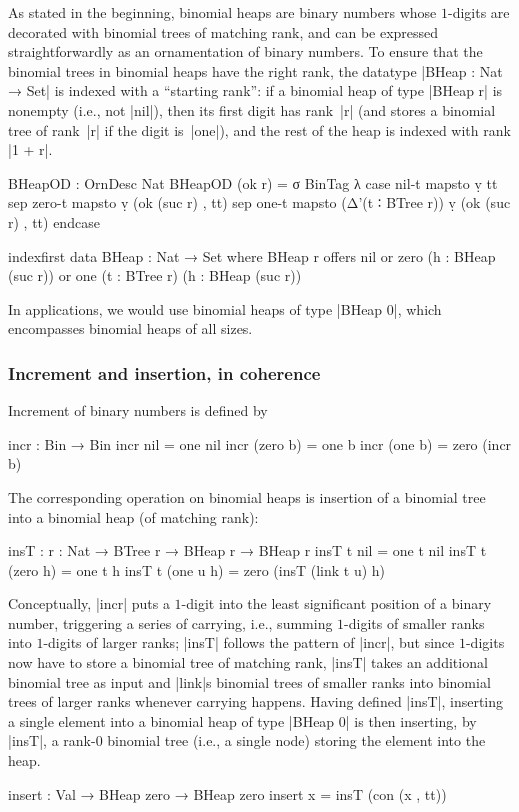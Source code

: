 As stated in the beginning, binomial heaps are binary numbers whose $1$-digits are decorated with binomial trees of matching rank, and can be expressed straightforwardly as an ornamentation of binary numbers.
To ensure that the binomial trees in binomial heaps have the right rank, the datatype |BHeap : Nat → Set| is indexed with a ``starting rank'': if a binomial heap of type |BHeap r| is nonempty (i.e., not |nil|), then its first digit has rank~|r| (and stores a binomial tree of rank~|r| if the digit is~|one|), and the rest of the heap is indexed with rank |1 + r|.
\begin{code}
BHeapOD : OrnDesc Nat
BHeapOD (ok r) = σ BinTag λ  case  nil-t   mapsto  ṿ tt
                             sep   zero-t  mapsto  ṿ (ok (suc r) , tt)
                             sep   one-t   mapsto  (Δ'(t ∶ BTree r)) ṿ (ok (suc r) , tt) endcase

indexfirst data BHeap : Nat → Set where
  BHeap r  offers  nil
           or      zero  (h : BHeap (suc r))
           or      one   (t : BTree r) (h : BHeap (suc r))
\end{code}
In applications, we would use binomial heaps of type |BHeap 0|, which encompasses binomial heaps of all sizes.

\subsubsection{Increment and insertion, in coherence}
Increment of binary numbers is defined by
\begin{code}
incr : Bin → Bin
incr nil        =  one nil
incr (zero  b)  =  one b
incr (one   b)  =  zero (incr b)
\end{code}
The corresponding operation on binomial heaps is insertion of a binomial tree into a binomial heap (of matching rank):
\begin{code}
insT : {r : Nat} → BTree r → BHeap r → BHeap r
insT t nil         = one t nil
insT t (zero   h)  = one t h
insT t (one u  h)  = zero (insT (link t u) h)
\end{code}
Conceptually, |incr| puts a $1$-digit into the least significant position of a binary number, triggering a series of carrying, i.e., summing $1$-digits of smaller ranks into $1$-digits of larger ranks; |insT| follows the pattern of |incr|, but since $1$-digits now have to store a binomial tree of matching rank, |insT| takes an additional binomial tree as input and |link|s binomial trees of smaller ranks into binomial trees of larger ranks whenever carrying happens.
Having defined |insT|, inserting a single element into a binomial heap of type |BHeap 0| is then inserting, by |insT|, a rank-$0$ binomial tree (i.e., a single node) storing the element into the heap.
\begin{code}
insert : Val → BHeap zero → BHeap zero
insert x = insT (con (x , tt))
\end{code}

